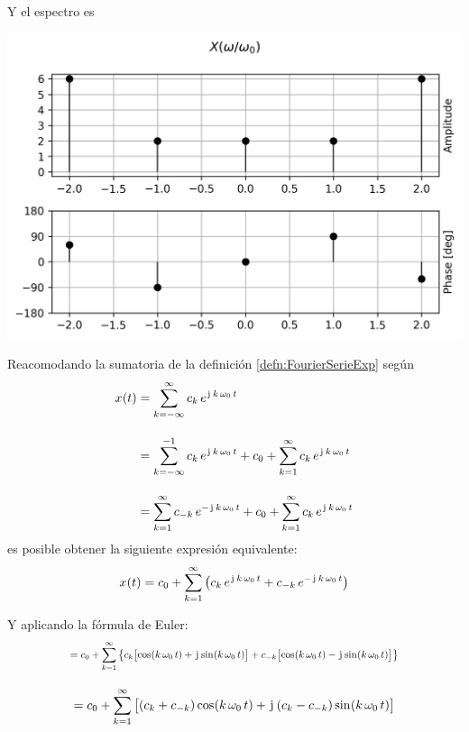 \begin{mdframed}[style=ExampleFrame]
    Y el espectro es
    \begin{center}
        \includegraphics[width=\linewidth]{./images/ej_serie_fourier.png}
    \end{center}
\end{mdframed}

Reacomodando la sumatoria de la definición \ref{defn:FourierSerieExp} según
\begin{align*}
    \fx[x]{t} &=
    \sum_{\kth=-\infty}^\infty c_\kth \, e^{\iu \, \kth \, \omega_0 \, t}
    \\[1em]
    &= \sum_{\kth=-\infty}^{-1} c_\kth \, e^{\iu \, \kth \, \omega_0 \, t} + c_0 + \sum_{\kth=1}^{\infty} c_\kth \, e^{\iu \, \kth \, \omega_0 \, t}
    \\[1em]
    &= \sum_{\kth=1}^{\infty} c_{-\kth} \, e^{-\iu \, \kth \, \omega_0 \, t} + c_0 + \sum_{\kth=1}^{\infty} c_\kth \, e^{\iu \, \kth \, \omega_0 \, t}
\end{align*}
es posible obtener la siguiente expresión equivalente:
\begin{equation}
    \fx[x]{t} = c_0 + \sum_{\kth=1}^{\infty} \inParentheses{ c_\kth \, e^{\iu \, \kth \, \omega_0 \, t} + c_{-\kth} \, e^{-\iu \, \kth \, \omega_0 \, t} }
    \label{eqn:FourierExpBis}
\end{equation}

Y aplicando la fórmula de Euler:
\begin{align*}
    &
    \scale{0.80}{
    = c_0 + \sum_{\kth=1}^{\infty} \inBraces{c_\kth \inBrackets{\fx[\cos]{\kth \, \omega_0 \, t} + \iu \fx[\sin]{\kth \, \omega_0 \, t}} + c_{-\kth} \inBrackets{\fx[\cos]{\kth \, \omega_0 \, t} - \iu \fx[\sin]{\kth \, \omega_0 \, t}} }
    }
    \\[1em]
    &= c_0 + \sum_{\kth=1}^{\infty} \inBrackets{ \inParentheses{c_\kth + c_{-\kth}} \fx[\cos]{\kth \, \omega_0 \, t} + \iu \inParentheses{c_\kth - c_{-\kth}} \fx[\sin]{\kth \, \omega_0 \, t} }
\end{align*}

